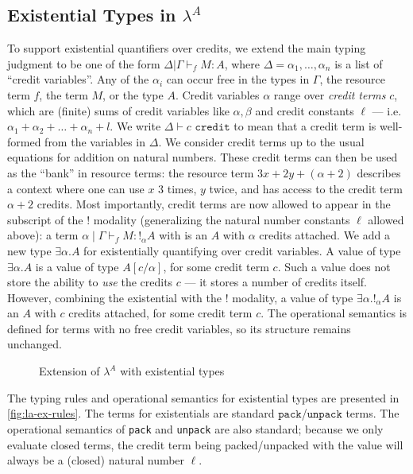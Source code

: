 \subsection{Existential Types in $\lambda^A$}
To support existential quantifiers over credits, we extend the main typing judgment to be one of the form $\Delta | \Gamma \vdash_f M : A$, where $\Delta = \alpha_1,\dots,\alpha_n$ is a list of ``credit variables''. Any of the $\alpha_i$ can occur free in the types in $\Gamma$, the resource term $f$, the term $M$, or the type $A$. Credit variables $\alpha$ range over \textit{credit terms} $c$, which are (finite) sums of credit variables like $\alpha,\beta$ and credit constants $\ell$ --- i.e. $\alpha_1 + \alpha_2 + \ldots + \alpha_n + l$.  We write $\Delta \vdash c \texttt{  credit}$ to mean that a credit term is well-formed from the variables in $\Delta$.  We consider credit terms up to the usual equations for addition on natural numbers.  These credit terms can then be used as the ``bank'' in resource terms: the resource term $3x + 2y + (\alpha + 2)$ describes a context where one can use $x$ $3$ times, $y$ twice, and has access to the credit term $\alpha + 2$ credits. Most importantly, credit terms are now allowed to appear in the subscript of the $!$ modality (generalizing the natural number constants $\ell$ allowed above): a term $\alpha \mid \Gamma \vdash_f M : !_\alpha A$ with is an $A$ with $\alpha$ credits attached.
We add a new type $\exists \alpha . A$ for existentially quantifying over credit variables.
A value of type $\exists \alpha . A$ is a value of type $A[c/\alpha]$, for some credit term $c$.  Such a value does not store the ability to \emph{use} the credits $c$ --- it stores a number of credits itself.
However, combining the existential with the $!$ modality,
a value of type $\exists \alpha. !_\alpha A$ is an $A$ with $c$ credits attached, for some credit term $c$.
The operational semantics is defined for terms with no free credit variables, so its structure remains unchanged.

\begin{figure}
  
  \caption{Extension of $\lambda^A$ with existential types}
  \label{fig:la-ex-rules}
\end{figure}

The typing rules and operational semantics for existential types are presented in \autoref{fig:la-ex-rules}.
The terms for existentials are standard $\texttt{pack}$/$\texttt{unpack}$ terms.
The operational semantics of \texttt{pack} and \texttt{unpack} are also standard; because we only evaluate closed terms, the credit term being packed/unpacked with the value will always be a (closed) natural number $\ell$.


